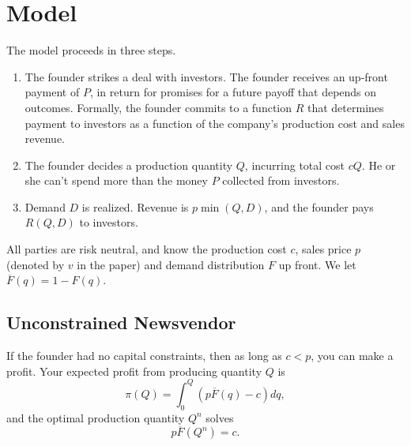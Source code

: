 \documentclass[11pt, oneside]{article}   	%
\newcommand{\fbar}{\overline{F}}
\begin{document}
\newpage
\section{Model}

The model proceeds in three steps.
\begin{enumerate}[leftmargin = 0.7 in]
\item[Round 1:] The founder strikes a deal with investors. The founder receives an up-front payment of $P$, in return for promises for a future payoff that depends on outcomes. Formally, the founder commits to a function $R$ that determines payment to investors as a function of the company's production cost and sales revenue.
\item[Round 2:] The founder decides a production quantity $Q$, incurring total cost $cQ$. He or she can't spend more than the money $P$ collected from investors. 
\item[Round 3:] Demand $D$ is realized. Revenue is $p\min(Q,D)$, and the founder pays $R(Q,D)$ to investors.
\end{enumerate}
All parties are risk neutral, and know the production cost $c$, sales price $p$ (denoted by $v$ in the paper) and demand distribution $F$ up front. We let $\fbar(q) = 1 - F(q)$.
\subsection{Unconstrained Newsvendor}
If the founder had no capital constraints, then as long as $c < p$, you can make a profit. Your expected profit from producing quantity $Q$ is
\begin{equation} \pi(Q) = \int_0^{Q} (p\fbar(q) - c)dq, \label{eq:newsvendor} \end{equation}
and the optimal production quantity $Q^n$ solves 
\begin{equation} p\fbar(Q^n) =c. \label{eq:news-opt} \end{equation}
\end{document}
